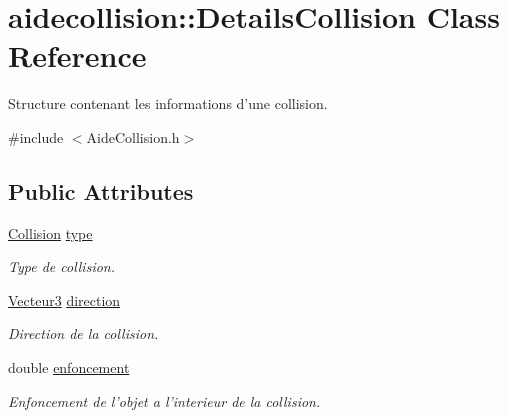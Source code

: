 \hypertarget{classaidecollision_1_1_details_collision}{\section{aidecollision\-:\-:Details\-Collision Class Reference}
\label{classaidecollision_1_1_details_collision}
}


Structure contenant les informations d'une collision.  




{\ttfamily \#include $<$Aide\-Collision.\-h$>$}

\subsection*{Public Attributes}
\begin{DoxyCompactItemize}
\item 
\hypertarget{classaidecollision_1_1_details_collision_a524989691331ea39d2c14c639f0de02e}{\hyperlink{namespaceaidecollision_a1c8613e2393aa3268262f9d23d60c0c9}{Collision} \hyperlink{classaidecollision_1_1_details_collision_a524989691331ea39d2c14c639f0de02e}{type}}\label{classaidecollision_1_1_details_collision_a524989691331ea39d2c14c639f0de02e}

\begin{DoxyCompactList}\small\item\em Type de collision. \end{DoxyCompactList}\item 
\hypertarget{classaidecollision_1_1_details_collision_a4ffc7c26ed439fca9cc1b1b77c741ce8}{\hyperlink{group__utilitaire_ga541aa4837ad9250d3a248dc82ee9ad4d}{Vecteur3} \hyperlink{classaidecollision_1_1_details_collision_a4ffc7c26ed439fca9cc1b1b77c741ce8}{direction}}\label{classaidecollision_1_1_details_collision_a4ffc7c26ed439fca9cc1b1b77c741ce8}

\begin{DoxyCompactList}\small\item\em Direction de la collision. \end{DoxyCompactList}\item 
\hypertarget{classaidecollision_1_1_details_collision_a6aa4cae3f313a2a16608dd60da0f97d1}{double \hyperlink{classaidecollision_1_1_details_collision_a6aa4cae3f313a2a16608dd60da0f97d1}{enfoncement}}\label{classaidecollision_1_1_details_collision_a6aa4cae3f313a2a16608dd60da0f97d1}

\begin{DoxyCompactList}\small\item\em Enfoncement de l'objet a l'interieur de la collision. \end{DoxyCompactList}\end{DoxyCompactItemize}


